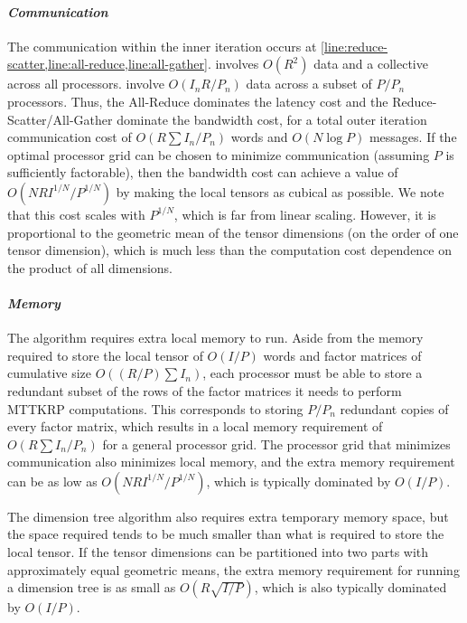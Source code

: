 \paragraph{\emph{Communication}}
The communication within the inner iteration occurs at \cref{line:reduce-scatter,line:all-reduce,line:all-gather}.
 involves $O(R^2)$ data and a collective across all processors.
 involve $O(I_nR/P_n)$ data across a subset of $P/P_n$ processors.
Thus, the All-Reduce dominates the latency cost and the Reduce-Scatter/All-Gather dominate the bandwidth cost, for a total outer iteration communication cost of $O(R\sum I_n/P_n)$ words and $O(N\log P)$ messages.
If the optimal processor grid can be chosen to minimize communication (assuming $P$ is sufficiently factorable), then the bandwidth cost can achieve a value of $O(NRI^{1/N}/P^{1/N})$ by making the local tensors as cubical as possible.
We note that this cost scales with $P^{1/N}$, which is far from linear scaling.
However, it is proportional to the geometric mean of the tensor dimensions (on the order of one tensor dimension), which is much less than the computation cost dependence on the product of all dimensions.

\paragraph{\emph{Memory}}
The algorithm requires extra local memory to run.
Aside from the memory required to store the local tensor of $O(I/P)$ words and factor matrices of cumulative size $O((R/P)\sum I_n)$, each processor must be able to store a redundant subset of the rows of the factor matrices it needs to perform MTTKRP computations.
This corresponds to storing $P/P_n$ redundant copies of every factor matrix, which results in a local memory requirement of $O(R \sum I_n/P_n)$ for a general processor grid.
The processor grid that minimizes communication also minimizes local memory, and the extra memory requirement can be as low as $O(NRI^{1/N}/P^{1/N})$, which is typically dominated by $O(I/P)$.

The dimension tree algorithm also requires extra temporary memory space, but the space required tends to be much smaller than what is required to store the local tensor.
If the tensor dimensions can be partitioned into two parts with approximately equal geometric means, the extra memory requirement for running a dimension tree is as small as $O(R\sqrt{I/P})$, which is also typically dominated by $O(I/P)$.



